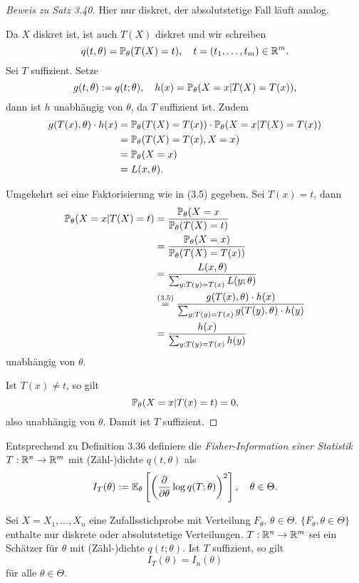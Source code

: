 \begin{proof}[Beweis zu Satz 3.40]
  Hier nur diskret, der absolutstetige Fall läuft analog.

  Da $X$ diskret ist, ist auch $T(X)$ diskret und wir schreiben
  \[ q(t, \theta) = \mathbb{P}_\theta(T(X) = t), \quad t =(t_1,\ldots, t_m) \in
    \mathbb{R}^m. \]
  Sei $T$ suffizient. Setze
  \[ g(t,\theta) := q(t;\theta), \quad h(x) = \mathbb{P}_\theta(X=x | T(X) = T(x)), \]
  dann ist $h$ unabhängig von $\theta$, da $T$ suffizient ist. Zudem
  \begin{align*}
    g(T(x), \theta) \cdot h(x)
    &= \mathbb{P}_\theta(T(X)=T(x)) \cdot \mathbb{P}_\theta(X=x|T(X) = T(x)) \\
    &= \mathbb{P}_\theta(T(X)=T(x), X=x) \\
    &= \mathbb{P}_\theta(X=x) \\
    &= L(x,\theta).
  \end{align*}
  
  Umgekehrt sei eine Faktorisierung wie in (3.5) gegeben. Sei $T(x) = t$, dann
  \begin{align*}
    \mathbb{P}_\theta(X=x|T(X) = t)
    &= \frac{\mathbb{P}_\theta(X=x}{\mathbb{P}_\theta(T(X)=t)} \\
    &= \frac{\mathbb{P}_\theta(X=x)}{\mathbb{P}_\theta(T(X)=T(x))} \\
    &= \frac{L(x,\theta)}{\sum_{y:T(y) = T(x)} L(y; \theta)} \\
    &\overset{(3.5)}{=} \frac{g(T(x),\theta) \cdot h(x)}
      {\sum_{y:T(y) = T(x)} g(T(y),\theta) \cdot h(y)} \\
    &= \frac{h(x)}
      {\sum_{y:T(y) = T(x)} h(y)}
  \end{align*}
  unabhängig von $\theta$.

  Ist $T(x) \ne t$, so gilt
  \[ \mathbb{P}_\theta(X=x|T(x)=t) = 0, \]
  also unabhängig von $\theta$. Damit ist $T$ suffizient.
\end{proof}

Entsprechend zu Definition 3.36 definiere die \emph{Fisher-Information einer
  Statistik} $T: \mathbb{R}^n \to \mathbb{R}^m$ mit (Zähl-)dichte $q(t,\theta)$ als
\[ I_T(\theta) := \mathbb{E}_\theta \left[ \left( \frac{\partial }{\partial \theta} \log q(T;\theta)
    \right)^2 \right], \quad \theta \in \Theta. \]

\begin{lem} %
  Sei $X = X_1, \ldots, X_n$ eine Zufallsstichprobe mit Verteilung $F_\theta$,
  $\theta \in \Theta$. $\{F_\theta, \theta \in \Theta\}$ enthalte nur diskrete
  oder absolutstetige Verteilungen. $T: \mathbb{R}^n \to \mathbb{R}^m$ sei ein Schätzer
  für $\theta$ mit (Zähl-)dichte $q(t;\theta)$. Ist $T$ suffizient, so gilt
  \[ I_T(\theta) = I_n(\theta) \]
  für alle $\theta \in \Theta$.
\end{lem}

